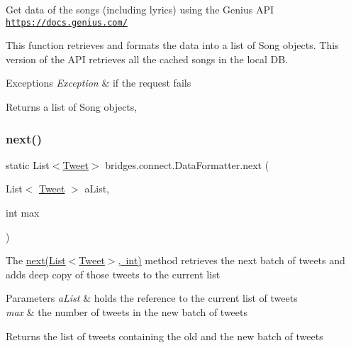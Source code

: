 Get data of the songs (including lyrics) using the Genius A\+PI \href{https://docs.genius.com/}{\tt https\+://docs.\+genius.\+com/}

This function retrieves and formats the data into a list of Song objects. This version of the A\+PI retrieves all the cached songs in the local DB.


\begin{DoxyExceptions}{Exceptions}
{\em Exception} & if the request fails\\
\hline
\end{DoxyExceptions}
\begin{DoxyReturn}{Returns}
a list of Song objects, 
\end{DoxyReturn}
\mbox{\label{classbridges_1_1connect_1_1_data_formatter_a3d0b2d2e0384d2a537bb61fbeb3d00a4}} 
\subsubsection{\texorpdfstring{next()}{next()}\hspace{0.1cm}{\footnotesize\ttfamily [1/2]}}
{\footnotesize\ttfamily static List$<$\mbox{\hyperlink{classbridges_1_1data__src__dependent_1_1_tweet}{Tweet}}$>$ bridges.\+connect.\+Data\+Formatter.\+next (\begin{DoxyParamCaption}\item[{List$<$ \mbox{\hyperlink{classbridges_1_1data__src__dependent_1_1_tweet}{Tweet}} $>$}]{a\+List,  }\item[{int}]{max }\end{DoxyParamCaption})\hspace{0.3cm}{\ttfamily [static]}}

The \mbox{\hyperlink{classbridges_1_1connect_1_1_data_formatter_a3d0b2d2e0384d2a537bb61fbeb3d00a4}{next(\+List$<$\+Tweet$>$, int)}} method retrieves the next batch of tweets and adds deep copy of those tweets to the current list 
\begin{DoxyParams}{Parameters}
{\em a\+List} & holds the reference to the current list of tweets \\
\hline
{\em max} & the number of tweets in the new batch of tweets \\
\hline
\end{DoxyParams}
\begin{DoxyReturn}{Returns}
the list of tweets containing the old and the new batch of tweets 
\end{DoxyReturn}

